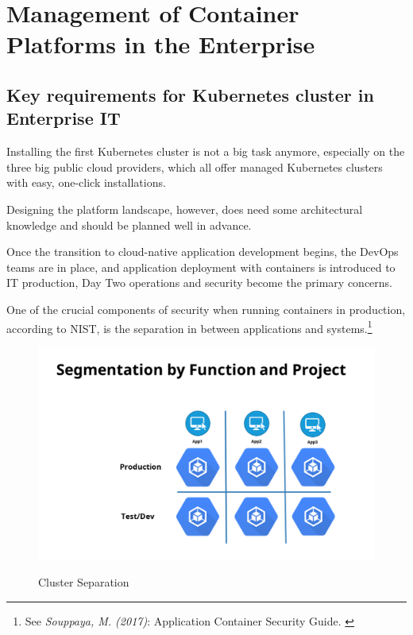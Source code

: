 %
%

\pagebreak
\section{Management of Container Platforms in the Enterprise}

\onehalfspacing

\subsection{Key requirements for Kubernetes cluster in Enterprise IT}

Installing the first Kubernetes cluster is not a big task anymore, especially on the three big public cloud providers, which all offer managed Kubernetes clusters with easy, one-click installations.

Designing the platform landscape, however, does need some architectural knowledge and should be planned well in advance.

Once the transition to cloud-native application development begins, the DevOps teams are in place, and application deployment with containers is introduced to IT production, Day Two operations and security become the primary concerns.

One of the crucial components of security when running containers in production, according to NIST, is the separation in between applications and systems.\footnote{See \textit{Souppaya, M. (2017)}: Application Container Security Guide. \cite{sp800-190}}

\begin{figure}[h]
\centering
\caption {Cluster Separation}
\includegraphics[width=\linewidth]{images/separation}
\label{fig:clusterSeparation}
\end{figure}

